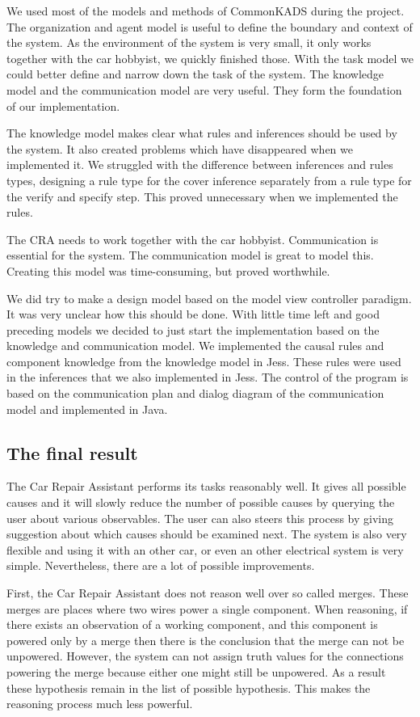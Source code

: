 \documentclass[a4paper,10pt]{article}
\begin{document}
We used most of the models and methods of CommonKADS during the project. The organization and agent
model is useful to define the boundary and context of the system. As the environment
of the system is very small, it only works together with the car hobbyist, we
quickly finished those. With the task model we could better define and narrow
down the task of the system. The knowledge model and the communication model
are very useful. They form the foundation of our implementation.

The knowledge
model makes clear what rules and inferences should be used by the system. It
also created problems which have disappeared when we implemented it. We struggled
with the
difference between inferences and rules types, designing a rule type for the
cover inference separately from a rule type for the verify and specify step. This
proved unnecessary when we implemented the rules.

The CRA needs to work together with the car hobbyist. Communication is essential
for the system. The communication model is great to model this. Creating this
model was time-consuming, but proved worthwhile.

We did try to make a design model based on the model view controller paradigm.
It was very unclear how this should be done. With little time left and good
preceding models we decided to just start the implementation based on the
knowledge and communication model. We implemented the causal rules and component
knowledge from the knowledge model in Jess. These rules were used in the
inferences that we also implemented in Jess. The control of the program is based
on the communication plan and dialog diagram of the communication model and
implemented in Java.

\subsection{The final result}
The Car Repair Assistant performs its tasks reasonably well. It gives all possible causes and it will slowly reduce the number of possible causes by querying the user about various observables. The user can also steers this process by giving suggestion about which causes should be examined next. The system is also very flexible and using it with an other car, or even an other electrical system is very simple. Nevertheless, there are a lot of possible improvements.

First, the Car Repair Assistant does not reason well over so called merges. These merges are places where two wires power a single component. When reasoning, if there exists an observation of a working component, and this component is powered only by a merge then there is the conclusion that the merge can not be unpowered. However, the system can not assign truth values for the connections powering the merge because either one might still be unpowered. As a result these hypothesis remain in the list of possible hypothesis. This makes the reasoning process much less powerful.
\end{document}
